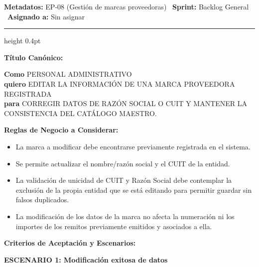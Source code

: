 \documentclass[a4paper,9pt]{article}
\begin{document}
\begin{tcolorbox}[hucard, title={\textbf{HU-254: MODIFICAR MARCA PROVEEDORA} \hfill \scriptsize \colorbox{bluestatus}{\textbf{\ New\ }} \quad \colorbox{white}{\textcolor{primarydark}{\textbf{\ 0 pts\ }}}}]
\vspace{-1pt}
\noindent\textbf{\footnotesize Metadatos:} EP-08 (Gestión de marcas proveedoras) \textbar\ \textbf{Sprint:} Backlog General \textbar\ \textbf{Asignado a:} Sin asignar\par\vspace{2pt}
\hrule height 0.4pt\par\vspace{3pt}
\noindent\textbf{\footnotesize Título Canónico:}\par\vspace{1pt}
{\small \textbf{Como} PERSONAL ADMINISTRATIVO \\ \textbf{quiero} EDITAR LA INFORMACIÓN DE UNA MARCA PROVEEDORA REGISTRADA \\ \textbf{para} CORREGIR DATOS DE RAZÓN SOCIAL O CUIT Y MANTENER LA CONSISTENCIA DEL CATÁLOGO MAESTRO.}\par\vspace{3pt}
\noindent\textbf{\footnotesize Reglas de Negocio a Considerar:}\par\vspace{1pt}
{\footnotesize
\begin{itemize}[leftmargin=12pt, nosep, itemsep=1.5pt, topsep=1pt]
\item La marca a modificar debe encontrarse previamente registrada en el sistema.
\item Se permite actualizar el nombre/razón social y el CUIT de la entidad.
\item La validación de unicidad de CUIT y Razón Social debe contemplar la exclusión de la propia entidad que se está editando para permitir guardar sin falsos duplicados.
\item La modificación de los datos de la marca no afecta la numeración ni los importes de los remitos previamente emitidos y asociados a ella.
\end{itemize}
}\par\vspace{3pt}
\noindent\textbf{\footnotesize Criterios de Aceptación y Escenarios:}\par\vspace{2pt}
{\footnotesize
\noindent\textbf{\textcolor{secondarydark}{ESCENARIO 1:  Modificación exitosa de datos}}\par\vspace{1pt}
}
\end{tcolorbox}
\end{document}
